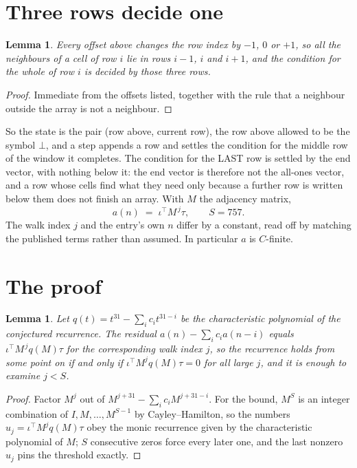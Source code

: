 \documentclass[11pt,a4paper]{article}
\theoremstyle{plain}
\newtheorem{lemma}[theorem]{Lemma}
\theoremstyle{definition}
\begin{document}
\section{Three rows decide one}

\begin{lemma}\label{lem:win}
Every offset above changes the row index by $-1$, $0$ or $+1$, so all the neighbours of a cell
of row $i$ lie in rows $i-1$, $i$ and $i+1$, and the condition for the whole of row $i$ is
decided by those three rows.
\end{lemma}

\begin{proof}
Immediate from the offsets listed, together with the rule that a neighbour outside the array is
not a neighbour.
\end{proof}

So the state is the pair (row above, current row), the row above allowed to be the symbol
$\bot$, and a step appends a row and settles the condition for the middle row of the window it
completes. The condition for the LAST row is settled by the end vector, with nothing below it:
the end vector is therefore not the all-ones vector, and a row whose cells find what they need
only because a further row is written below them does not finish an array. With $M$ the
adjacency matrix,
\[
a(n)\;=\;\iota^{\!\top}M^{\,j}\tau ,\qquad S=757.
\]
The walk index $j$ and the entry's own $n$ differ by a constant, read off by matching the
published terms rather than assumed. In particular $a$ is $C$-finite.

\section{The proof}

\begin{lemma}\label{lem:crit}
Let $q(t)=t^{31}-\sum_i c_it^{31-i}$ be the characteristic polynomial of the
conjectured recurrence. The residual $a(n)-\sum_ic_ia(n-i)$ equals
$\iota^{\!\top}M^{\,j}q(M)\tau$ for the corresponding walk index $j$, so the recurrence
holds from some point on if and only if $\iota^{\!\top}M^{j}q(M)\tau=0$ for all large $j$,
and it is enough to examine $j<S$.
\end{lemma}

\begin{proof}
Factor $M^{j}$ out of $M^{j+31}-\sum_ic_iM^{j+31-i}$. For the bound, $M^{S}$
is an integer combination of $I,M,\dots,M^{S-1}$ by Cayley--Hamilton, so the numbers
$u_j=\iota^{\!\top}M^{j}q(M)\tau$ obey the monic recurrence given by the characteristic
polynomial of $M$; $S$ consecutive zeros force every later one, and the last nonzero $u_j$
pins the threshold exactly.
\end{proof}
\end{document}
